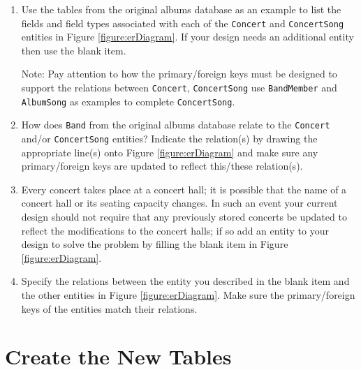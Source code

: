 \documentclass[12pt]{exam}
\begin{document}
\begin{enumerate}
  \item Use the tables from the original albums database as an example to 
    list the fields and field types associated with each of the 
    \texttt{Concert} and \texttt{ConcertSong} entities in 
    Figure \ref{figure:erDiagram}.  If your design needs an additional entity then 
    use the blank item. 
    
    Note: Pay attention to how the primary/foreign keys must be designed to 
    support the relations between \texttt{Concert}, 
    \texttt{ConcertSong} use \texttt{BandMember} and 
    \texttt{AlbumSong} as examples to complete \texttt{ConcertSong}. 
    
  \item How does \texttt{Band} from the original albums database 
    relate to the \texttt{Concert} and/or \texttt{ConcertSong} 
    entities? Indicate the relation(s) by drawing the appropriate line(s) onto 
    Figure \ref{figure:erDiagram} and make sure any primary/foreign keys are 
    updated to reflect this/these relation(s). 
  \item Every concert takes place at a concert hall; it is possible that the 
    name of a concert hall or its seating capacity changes. In such an event 
    your current design should not require that any previously stored concerts 
    be updated to reflect the modifications to the concert halls; if so add an 
    entity to your design to solve the problem by filling the blank item in 
    Figure \ref{figure:erDiagram}.
  \item Specify the relations between the entity you described in the blank 
    item and the other entities in Figure \ref{figure:erDiagram}. Make sure the 
    primary/foreign keys of the entities match their relations.
\end{enumerate}

\section{Create the New Tables}
\end{document}
